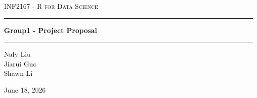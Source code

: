 \begin{titlepage}
\centering
\vspace*{2.5cm}

{\scshape\Large INF2167 - R for Data Science\par}
\vspace{1.5cm}

\rule{\linewidth}{0.4pt}\par
\vspace{0.9cm}
{\huge\bfseries Group1 - Project Proposal\par}
\vspace{0.9cm}
\rule{\linewidth}{0.4pt}\par

\vspace{2.5cm}
{\large
Naly Liu \\[0.6em]
Jiarui Guo \\[0.6em]
Shawn Li \\
\par}

\vfill
{\large June 18, 2026\par}
\end{titlepage}

